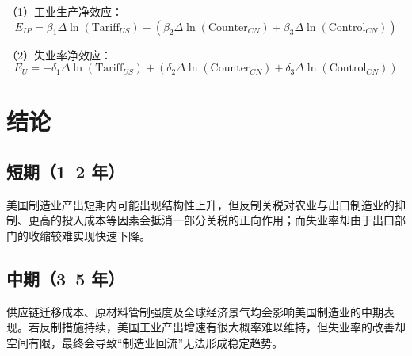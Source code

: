 \documentclass[12pt]{ctexart}
\begin{document}
（1）工业生产净效应：
\begin{equation}
E_{IP} = 
\beta_1 \Delta\ln(\text{Tariff}_{US})
-
\left(
\beta_2 \Delta\ln(\text{Counter}_{CN})
+
\beta_3 \Delta\ln(\text{Control}_{CN})
\right)
\end{equation}

（2）失业率净效应：
\begin{equation}
E_{U} = 
- \delta_1 \Delta\ln(\text{Tariff}_{US})
+
\left(
\delta_2 \Delta\ln(\text{Counter}_{CN})
+
\delta_3 \Delta\ln(\text{Control}_{CN})
\right)
\end{equation}

\section{结论}

\subsection{短期（1–2 年）}

美国制造业产出短期内可能出现结构性上升，但反制关税对农业与出口制造业的抑制、更高的投入成本等因素会抵消一部分关税的正向作用；而失业率却由于出口部门的收缩较难实现快速下降。

\subsection{中期（3–5 年）}

供应链迁移成本、原材料管制强度及全球经济景气均会影响美国制造业的中期表现。若反制措施持续，美国工业产出增速有很大概率难以维持，但失业率的改善却空间有限，最终会导致“制造业回流”无法形成稳定趋势。
\end{document}
